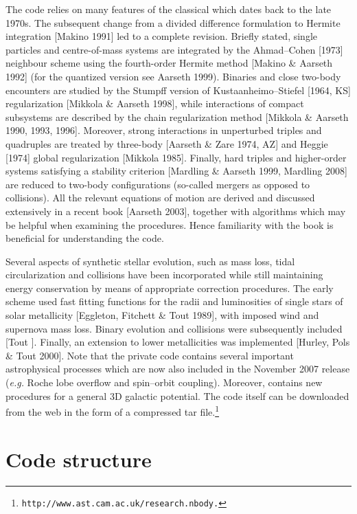\documentclass[12pt]{article}
\begin{document}
The code relies on many features of the classical {} which dates
back to the late 1970s.
The subsequent change from a divided difference formulation to Hermite
integration [Makino 1991] led to a complete revision.
Briefly stated, single particles and centre-of-mass systems are integrated
by the Ahmad--Cohen [1973] neighbour scheme using the fourth-order Hermite
method [Makino \& Aarseth 1992] (for the quantized version see Aarseth 1999).
Binaries and close two-body encounters are studied by the Stumpff version of
Kustaanheimo--Stiefel [1964, KS] regularization [Mikkola \& Aarseth 1998],
while interactions of compact subsystems are described by the chain
regularization method [Mikkola \& Aarseth 1990, 1993, 1996].
Moreover, strong interactions in unperturbed triples and quadruples are
treated by three-body [Aarseth \& Zare 1974, AZ] and Heggie [1974] global
regularization [Mikkola 1985].
Finally, hard triples and higher-order systems satisfying a stability
criterion [Mardling \& Aarseth 1999, Mardling 2008] are reduced to two-body
configurations (so-called mergers as opposed to collisions).
All the relevant equations of motion are derived and discussed extensively in
a recent book [Aarseth 2003], together with algorithms which may be helpful
when examining the {} procedures.
Hence familiarity with the book is beneficial for understanding the code.

Several aspects of synthetic stellar evolution, such as mass loss, tidal
circularization and collisions have been incorporated while still maintaining
energy conservation by means of appropriate correction procedures.
The early scheme used fast fitting functions for the radii and luminosities of
single stars of solar metallicity [Eggleton, Fitchett \& Tout 1989], with
imposed wind and supernova mass loss.
Binary evolution and collisions were subsequently included [Tout ].
Finally, an extension to lower metallicities was implemented
[Hurley, Pols \& Tout 2000].
Note that the private {} code {}
contains several important astrophysical processes which are now also included
in the November 2007 release ({\it e.g.} Roche lobe overflow and spin--orbit
coupling).
Moreover, {} contains new procedures for a general 3D galactic
potential.
The code itself can be downloaded from the web in the form of a compressed
tar file.\footnote{\tt http://www.ast.cam.ac.uk/research.nbody.}

\section{Code structure}
\end{document}
